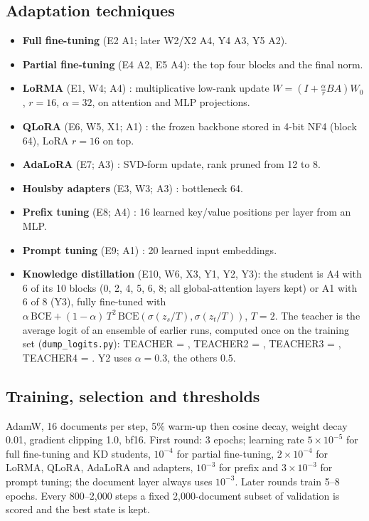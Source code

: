 \documentclass[11pt,a4paper]{article}
\newcommand{\code}[1]{\texttt{\small #1}}
\begin{document}
\subsection{Adaptation techniques}
\begin{itemize}
  \item \textbf{Full fine-tuning} (E2 A1; later W2/X2 A4, Y4 A3, Y5 A2).
  \item \textbf{Partial fine-tuning} (E4 A2, E5 A4): the top four blocks and the final norm.
  \item \textbf{LoRMA} (E1, W4; A4) \cite{bihany2025lorma}: multiplicative low-rank update
  $W=(I+\tfrac{\alpha}{r}BA)W_0$, $r=16$, $\alpha=32$, on attention and MLP projections.
  \item \textbf{QLoRA} (E6, W5, X1; A1) \cite{dettmers2023qlora}: the frozen backbone stored in 4-bit NF4 (block 64),
  LoRA $r=16$ on top.
  \item \textbf{AdaLoRA} (E7; A3) \cite{zhang2023adalora}: SVD-form update, rank pruned from 12 to 8.
  \item \textbf{Houlsby adapters} (E3, W3; A3) \cite{houlsby2019adapters}: bottleneck 64.
  \item \textbf{Prefix tuning} (E8; A4) \cite{li2021prefix}: 16 learned key/value positions per layer from an MLP.
  \item \textbf{Prompt tuning} (E9; A1) \cite{lester2021prompt}: 20 learned input embeddings.
  \item \textbf{Knowledge distillation} \cite{hinton2015kd} (E10, W6, X3, Y1, Y2, Y3): the student is A4 with 6 of
  its 10 blocks (0, 2, 4, 5, 6, 8; all global-attention layers kept) or A1 with 6 of 8 (Y3), fully fine-tuned with
  $\alpha\,\mathrm{BCE} + (1-\alpha)\,T^2\,\mathrm{BCE}(\sigma(z_s/T), \sigma(z_t/T))$, $T=2$.  The teacher is the
  average logit of an ensemble of earlier runs, computed once on the training set (\code{dump\_logits.py}):
  TEACHER = \membersteacher, TEACHER2 = \membersteachertwo, TEACHER3 = \membersteacherthree, TEACHER4 =
  \membersteacherfour.  Y2 uses $\alpha=0.3$, the others $0.5$.
\end{itemize}

\subsection{Training, selection and thresholds}\label{sec:train}
AdamW, 16 documents per step, 5\% warm-up then cosine decay, weight decay 0.01, gradient clipping 1.0, bf16.
First round: 3 epochs; learning rate $5\times10^{-5}$ for full fine-tuning and KD students, $10^{-4}$ for
partial fine-tuning, $2\times10^{-4}$ for LoRMA, QLoRA, AdaLoRA and adapters, $10^{-3}$ for prefix and
$3\times10^{-3}$ for prompt tuning; the document layer always uses $10^{-3}$.  Later rounds train 5--8 epochs.
Every 800--2{,}000 steps a fixed 2{,}000-document subset of validation is scored and the best state is kept.
\end{document}
